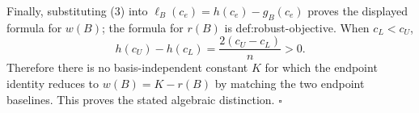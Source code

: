 Finally, substituting (3) into \(\ell_B(c_e)=h(c_e)-g_B(c_e)\) proves the displayed formula for \(w(B)\); the formula for \(r(B)\) is def:robust-objective. When \(c_L<c_U\),
\[
h(c_U)-h(c_L)=\frac{2(c_U-c_L)}n>0.
\]
Therefore there is no basis-independent constant \(K\) for which the endpoint identity reduces to \(w(B)=K-r(B)\) by matching the two endpoint baselines. This proves the stated algebraic distinction. \(\square\)